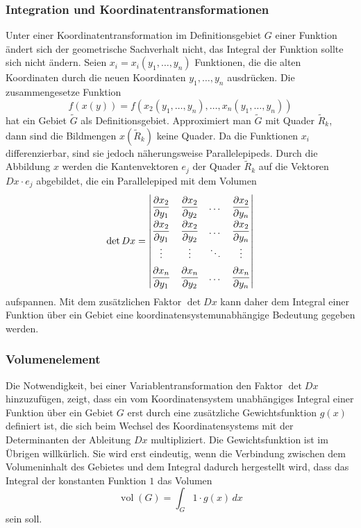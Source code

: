 \subsubsection{Integration und Koordinatentransformationen}
Unter einer Koordinatentransformation im Definitionsgebiet 
$G$ einer Funktion ändert sich der geometrische Sachverhalt nicht,
das Integral der Funktion sollte sich nicht ändern.
Seien $x_i=x_i(y_1,\dots,y_n)$ Funktionen, die die alten Koordinaten
durch die neuen Koordinaten $y_1,\dots,y_n$ ausdrücken.
Die zusammengesetze Funktion
\[
f(x(y))
=
f(x_2(y_1,\dots,y_n),\dots,x_n(y_1,\dots,y_n))
\]
hat ein Gebiet $\tilde{G}$ als Definitionsgebiet.
Approximiert man $\tilde{G}$ mit Quader $\tilde{R}_k$, dann sind
die Bildmengen $x(\tilde{R}_k)$ keine Quader.
Da die Funktionen $x_i$ differenzierbar, sind sie jedoch näherungsweise
Parallelepipeds.
Durch die Abbildung $x$ werden die Kantenvektoren $e_j$ der Quader 
$\tilde{R}_k$ auf die Vektoren $Dx\cdot e_j$ abgebildet, die ein
Parallelepiped mit dem Volumen
\[
\det Dx
=
\left|
\renewcommand{\arraystretch}{1.9}
\begin{matrix}
\displaystyle
\frac{\partial x_2}{\partial y_1}
&
\displaystyle
\frac{\partial x_2}{\partial y_2}
&\dots&
\displaystyle
\frac{\partial x_2}{\partial y_n}
\\
\displaystyle
\frac{\partial x_2}{\partial y_1}
&
\displaystyle
\frac{\partial x_2}{\partial y_2}
&\dots&
\displaystyle
\frac{\partial x_2}{\partial y_n}
\\
\vdots&\vdots&\ddots&\vdots\\
\displaystyle
\frac{\partial x_n}{\partial y_1}
&
\displaystyle
\frac{\partial x_n}{\partial y_2}
&\dots&
\displaystyle
\frac{\partial x_n}{\partial y_n}
\end{matrix}
\right|
\]
aufspannen.
Mit dem zusätzlichen Faktor $\det Dx$ kann daher dem Integral einer Funktion
über ein Gebiet eine koordinatensystemunabhängige Bedeutung gegeben werden.

%
%
\subsubsection{Volumenelement}
Die Notwendigkeit, bei einer Variablentransformation den Faktor
$\det Dx$ hinzuzufügen, zeigt, dass ein vom Koordinatensystem unabhängiges
Integral einer Funktion über ein Gebiet $G$ erst durch eine zusätzliche
Gewichtsfunktion $g(x)$ definiert ist, die sich beim Wechsel des
Koordinatensystems mit der Determinanten der Ableitung $Dx$ multipliziert.
Die Gewichtsfunktion ist im Übrigen willkürlich.
Sie wird erst eindeutig,
wenn die Verbindung zwischen dem Volumeninhalt des Gebietes und 
dem Integral dadurch hergestellt wird, dass das Integral der konstanten
Funktion $1$ das Volumen
\[
\operatorname{vol}(G)
=
\int_G 1\cdot g(x)\,dx
\]
sein soll.

